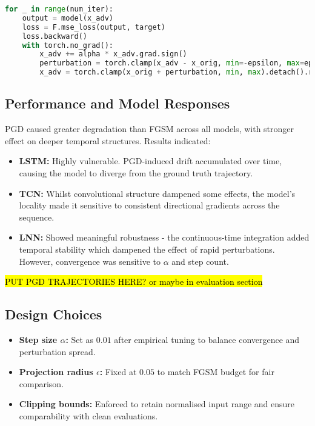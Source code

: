 \begin{lstlisting}[language=Python, caption={PGD Attack Loop (Simplified)}]
for _ in range(num_iter):
    output = model(x_adv)
    loss = F.mse_loss(output, target)
    loss.backward()
    with torch.no_grad():
        x_adv += alpha * x_adv.grad.sign()
        perturbation = torch.clamp(x_adv - x_orig, min=-epsilon, max=epsilon)
        x_adv = torch.clamp(x_orig + perturbation, min, max).detach().requires_grad_()
\end{lstlisting}

\subsection{Performance and Model Responses}
PGD caused greater degradation than FGSM across all models, with stronger effect on deeper temporal structures. Results indicated:
\begin{itemize}
    \item \textbf{LSTM:} Highly vulnerable. PGD-induced drift accumulated over time, causing the model to diverge from the ground truth trajectory.
    \item \textbf{TCN:} Whilst convolutional structure dampened some effects, the model's locality made it sensitive to consistent directional gradients across the sequence.
    \item \textbf{LNN:} Showed meaningful robustness - the continuous-time integration added temporal stability which dampened the effect of rapid perturbations. However, convergence was sensitive to $\alpha$ and step count.
\end{itemize}

\hl{PUT PGD TRAJECTORIES HERE? or maybe in evaluation section}


\subsection{Design Choices}
\begin{itemize}
    \item \textbf{Step size $\alpha$:} Set as $0.01$ after empirical tuning to balance convergence and perturbation spread.
    \item \textbf{Projection radius $\epsilon$:} Fixed at $0.05$ to match FGSM budget for fair comparison.
    \item \textbf{Clipping bounds:} Enforced to retain normalised input range and ensure comparability with clean evaluations.
\end{itemize}

